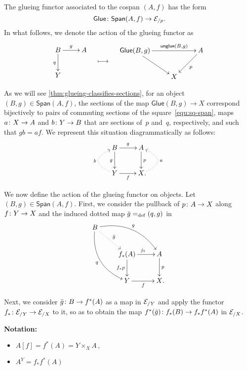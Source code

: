 \documentclass[reqno,a4paper,oneside]{amsart}
\begin{document}
The glueing functor associated to the cospan $(A, f)$ has the form
\[
 \mathsf{Glue} \co \mathsf{Span}(A, f)  \to \cal{E}_{/p} \rlap{.}
\]
In what follows, we  denote the action of the glueing functor as
\[
\begin{gathered}
\xymatrix{
B \ar[d]_{q} \ar[r]^{g} & A \\
Y & }
\end{gathered} \quad
\longmapsto \quad
\begin{gathered}
\xymatrix{
\mathsf{Glue}(B, g) \ar[rr]^-{\mathsf{unglue}(B,g)}  \ar[dr] & &  A \ar[dl]^{p} \\
 & X & }
 \end{gathered}
 \]


\medskip

As we will see \cref{thm:glueing-classifies-sections}, for an object $(B, g) \in \mathsf{Span}(A, f)$, the sections of the map  $\mathsf{Glue}(B,g)  \to X$ correspond bijectively to
pairs of commuting sections of the square~\eqref{equ:sq-span}, \ie 
maps $a \co X \to A$ and $b \co Y \to B$ that are sections of~$p$ and~$q$, respectively, and such that 
$g b  = a f $. We represent this situation diagrammatically as follows:
\[
\xymatrix{ 
B \ar[d]_{g} \ar[r]^{g}  & A \ar[d]^{p} \\
\ar@/^2pc/@{.>}[u]^{b} Y \ar[r]_{f} & X  \ar@/_2pc/@{.>}[u]_{a} \rlap{.}}
\]



We now define the action of the glueing functor on objects. Let $(B,g) \in \mathsf{Span}(A, f)$. First, we consider the pullback of $p \co A \to X$ along $f \co Y \to X$ and the induced dotted map $\bar{g} \defeq 
(q,g)$ in 
\[
\xymatrix{
B \ar@/^1.5pc/[drr]^g \ar@/_1.5pc/[ddr]_{q} \ar@{.>}[dr]^{\bar{g}}  & & \\ 
 &   f_* (A) \ar[d]_{f_*{p}}  \ar[r]^{j_1}   & A \ar[d]^{p} \\
  & Y \ar[r]_{f}  & X \rlap{.}} 
\]


Next, we consider $\bar{g} \co B \to f^*(A)$ as a map in $\cal{E}_{/Y}$ and apply the functor 
$f_* \co \cal{E}_{/Y} \to \cal{E}_{/X}$ to it, so as to obtain the 
map $f^*(\bar{g}) \co  f_* (B)  \to f_* f^* (A)$ in $\cal{E}_{/X}$. 



{\bf Notation:} 
\begin{itemize}
\item $A[f] = f^*(A) = Y \times_X A \, ,$
\item $A^Y  = f_* f^*(A)$
\end{itemize}
\end{document}
